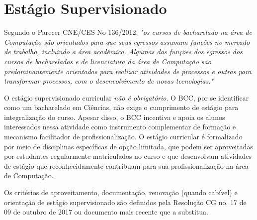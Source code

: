 \section{Estágio Supervisionado}
\label{sec:estagio}

Segundo o Parecer CNE/CES No 136/2012, \textit{"os cursos de bacharelado na área de Computação são orientados para que seus egressos assumam funções no mercado de trabalho, incluindo a área acadêmica. Algumas das funções dos egressos dos cursos de bacharelados e de licenciatura da área de Computação são predominantemente orientadas para realizar atividades de processos e outras para transformar processos, com o desenvolvimento de novas tecnologias."}

O estágio supervisionado curricular \textit{não é obrigatório}. O BCC, por se identificar como um bacharelado em Ciências, não exige o cumprimento de estágio para integralização do curso. Apesar disso, o BCC incentiva e apoia os alunos interessados nessa atividade como instrumento complementar de formação e mecanismo facilitador de profissionalização. O estágio curricular é formalizado por meio de disciplinas específicas de opção limitada, que podem ser aproveitadas por estudantes regularmente matriculados no curso e que desenvolvam atividades de estágio que reconhecidamente contribuam para sua profissionalização na área de Computação.

Os critérios de aproveitamento, documentação, renovação (quando cabível) e orientação de estágio supervisionado são definidos pela Resolução CG no. 17 de 09 de outubro de 2017 ou documento mais recente que a substitua.


